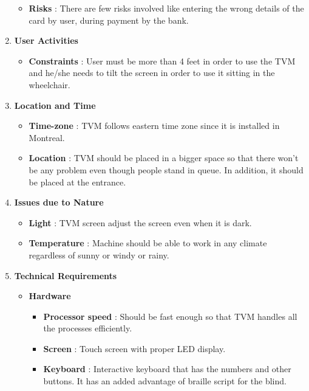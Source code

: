 \documentclass[15pt]{article}
\begin{document}
\begin{enumerate}[leftmargin=2em, itemsep=0pt, parsep=0pt, , font=\Large\bfseries]
\begin{itemize}
            \item {\Large\bfseries Risks} : There are few risks involved like entering the wrong details of the card by user, during payment by the bank.
        \end{itemize}
    \item {\Large\bfseries User Activities}
        \begin{itemize}
                \item {\Large\bfseries Constraints} : User must be more than 4 feet in order to use the TVM and he/she needs to tilt the screen in order to use it sitting in the wheelchair.
        \end{itemize}
    \item {\Large\bfseries Location and Time}
        \begin{itemize}
            \item {\Large\bfseries Time-zone} : TVM follows eastern time zone since it is installed in Montreal.
            \item {\Large\bfseries Location} : TVM should be placed in a bigger space so that there won’t be any problem even though people stand in queue. In addition, it should be placed at the entrance.
        \end{itemize}
    \item {\Large\bfseries Issues due to Nature}
        \begin{itemize}
            \item {\Large\bfseries Light} : TVM screen adjust the screen even when it is dark.
            \item {\Large\bfseries Temperature} : Machine should be able to work in any climate regardless of sunny or windy or rainy.
        \end{itemize}
    \item {\Large\bfseries Technical Requirements}
        \begin{itemize}
            \item {\Large\bfseries Hardware}
                \begin{itemize}
                    \item {\Large\bfseries Processor speed} : Should be fast enough so that TVM handles all the processes efficiently.
                    \item {\Large\bfseries Screen} : Touch screen with proper LED display.
                    \item {\Large\bfseries Keyboard} : Interactive keyboard that has the numbers and other buttons. It has an added advantage of braille script for the blind.

\end{itemize}
\end{itemize}
\end{enumerate}
\end{document}
